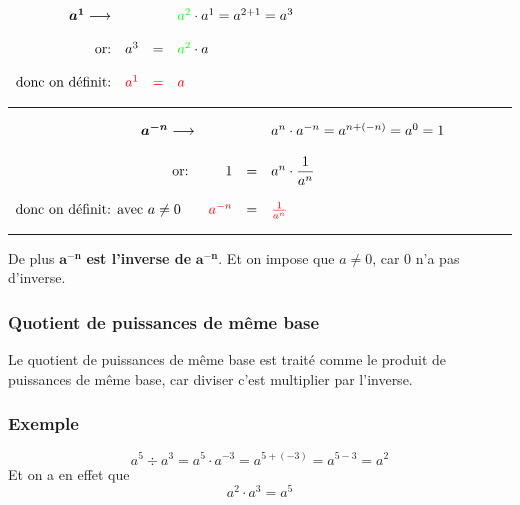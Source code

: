 \documentclass[
  12pt,
]{book}
\begin{document}
\(\begin{array}{rrcl}  \boldsymbol{a^1}\longrightarrow & & & {\color{green}a^2}\cdot a^1 = a^{2+1} = a^3\\  &&&\\  \text{or:}& a^3 & = & {\color{green}a^2}\cdot a\\  &&&\\  \text{donc on définit:}&{\color{red}a^1} & {\color{red}=} & {\color{red}a}\\  \end{array}\)

\begin{center}\rule{0.5\linewidth}{0.5pt}\end{center}

\(\begin{array}{rrcl}  \boldsymbol{a^{-n}}\longrightarrow & & & a^n \cdot a^{-n} = a^{n+(-n)} = a^0 = 1\\  & & &\\  \text{ or: } & 1 & = & a^n \cdot \dfrac{1}{a^n}\\  & & &\\  \text{donc on définit: avec } a\ne 0\quad & \color{red} a^{-n} & = & \color{red} \frac{1}{a^n}\\  \end{array}\)

\begin{center}\rule{0.5\linewidth}{0.5pt}\end{center}

De plus \(\boldsymbol{a^{-n}}\) \textbf{est l'inverse de} \(\boldsymbol{a^{-n}}\). Et on impose que \(a\neq 0\), car \(0\) n'a pas d'inverse.

\hypertarget{quotient-de-puissances-de-muxeame-base}{%
\subsubsection{Quotient de puissances de même base}\label{quotient-de-puissances-de-muxeame-base}}

Le quotient de puissances de même base est traité comme le produit de puissances de même base, car diviser c'est multiplier par l'inverse.

\hypertarget{exemple}{%
\subsubsection{Exemple}\label{exemple}}

\[a^5\div a^3= a^5\cdot a^{-3} = a^{5+(-3)}=a^{5-3}=a^2\]
Et on a en effet que \[a^2\cdot a^3 = a^5\]
\end{document}
